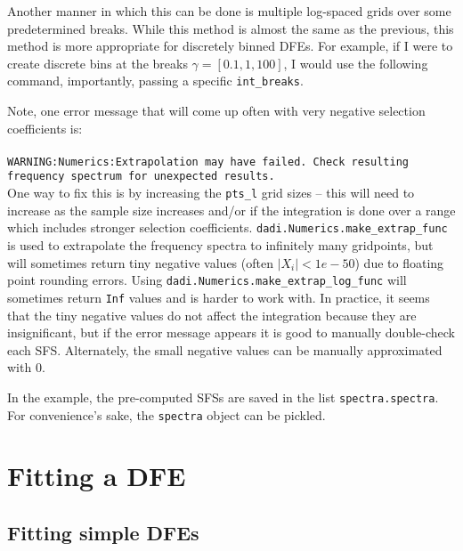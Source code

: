 \documentclass[11pt]{article}
\begin{document}


Another manner in which this can be done is multiple log-spaced grids over some predetermined breaks. While this method is almost the same as the previous, this method is more appropriate for discretely binned DFEs. For example, if I were to create discrete bins at the breaks $\gamma=[0.1, 1, 100]$, I would use the following command, importantly, passing a specific \texttt{int\_breaks}.



Note, one error message that will come up often with very negative selection coefficients is: \\ \\
\texttt{WARNING:Numerics:Extrapolation may have failed. Check resulting frequency spectrum for unexpected results.} \\

One way to fix this is by increasing the \texttt{pts\_l} grid sizes -- this will need to increase as the sample size increases and/or if the integration is done over a range which includes stronger selection coefficients. \texttt{dadi.Numerics.make\_extrap\_func} is used to extrapolate the frequency spectra to infinitely many gridpoints, but will sometimes return tiny negative values (often $|X_i|<1e-50$) due to floating point rounding errors. Using \texttt{dadi.Numerics.make\_extrap\_log\_func} will sometimes return \texttt{Inf} values and is harder to work with. In practice, it seems that the tiny negative values do not affect the integration because they are insignificant, but if the error message appears it is good to manually double-check each SFS. Alternately, the small negative values can be manually approximated with 0. 

In the example, the pre-computed SFSs are saved in the list \texttt{spectra.spectra}. For convenience's sake, the \texttt{spectra} object can be pickled.



\section{Fitting a DFE}

\subsection{Fitting simple DFEs}
\end{document}
